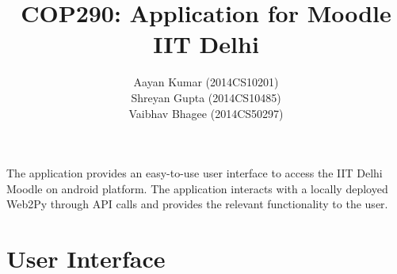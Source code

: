 \documentclass[12pt]{article}
\title{COP290: Application for Moodle IIT Delhi}
\author{Aayan Kumar (2014CS10201) \\ Shreyan Gupta (2014CS10485) \\ Vaibhav Bhagee (2014CS50297) }
\begin{document}
\maketitle

The application provides an easy-to-use user interface to access the IIT Delhi Moodle on android platform. The application interacts with a locally deployed Web2Py through API calls and provides the relevant functionality to the user. 

\section{User Interface}

\begin{center}
\begin{tabular}{c c c}
     

\end{tabular}
\end{center}
\end{document}
